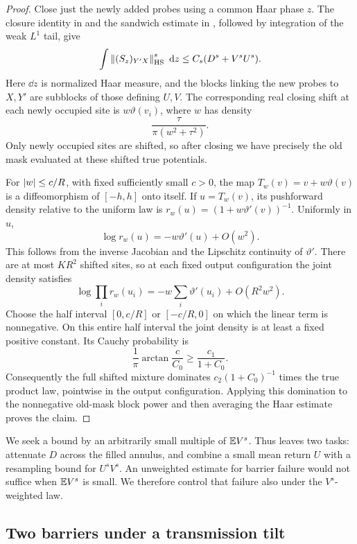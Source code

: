 \begin{proof}
Close just the newly added probes using a common Haar phase \(z\).
The closure identity in  and the sandwich estimate in
, followed by integration of the weak \(L^1\) tail, give
\[
 \int\left\lVert(S_z)_{Y'X}\right\rVert_{\rm HS}^{s}\,\,\mathrm d z
       \le C_s(D^s+V^sU^s).
\]
Here \(\dd z\) is normalized Haar measure, and the blocks linking the
new probes to \(X,Y'\) are subblocks of those defining \(U,V\).
The corresponding real closing shift at each newly occupied site is
\(w\vartheta(v_i)\), where \(w\) has density
\[
                 \frac{\tau}{\pi(w^2+\tau^2)}.
\]
Only newly occupied sites are shifted, so after closing we have precisely
the old mask evaluated at these shifted true potentials.

For \(\left\lvert w\right\rvert\le c/R\), with fixed sufficiently small \(c>0\), the map
\(T_w(v)=v+w\vartheta(v)\) is a diffeomorphism of \([-h,h]\) onto
itself. If \(u=T_w(v)\), its pushforward density relative to the uniform
law is \(r_w(u)=(1+w\vartheta'(v))^{-1}\). Uniformly in \(u\),
\[
 \log r_w(u)=-w\vartheta'(u)+O(w^2).
\]
This follows from the inverse Jacobian and the Lipschitz continuity of
\(\vartheta'\). There are at most \(K R^2\) shifted sites, so at each
fixed output configuration the joint density satisfies
\[
 \log\prod_i r_w(u_i)
        =-w\sum_i\vartheta'(u_i)+O(R^2w^2).
\]
Choose the half interval \([0,c/R]\) or \([-c/R,0]\) on which the linear
term is nonnegative. On this entire half interval the joint density is
at least a fixed positive constant. Its Cauchy probability is
\[
 \frac1\pi\arctan\frac c{C_0}\ge\frac{c_1}{1+C_0}.
\]
Consequently the full shifted mixture dominates
\(c_2(1+C_0)^{-1}\) times the true product law, pointwise in the output
configuration. Applying this domination to the nonnegative old-mask
block power and then averaging the Haar estimate proves the claim.
\end{proof}

We seek a bound by an arbitrarily small multiple of \(\mathbb E V^s\).
Thus  leaves two tasks: attenuate \(D\) across
the filled annulus, and combine a small mean return \(U\) with a
resampling bound for \(U^sV^s\). An unweighted estimate for barrier
failure would not suffice when \(\mathbb E V^s\) is small. We therefore
control that failure also under the \(V^s\)-weighted law.

\subsection{Two barriers under a transmission tilt}

